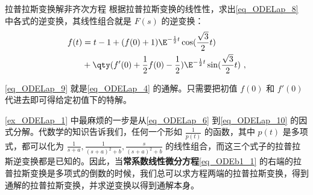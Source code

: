 \begin{example}{拉普拉斯变换解非齐次方程}
根据拉普拉斯变换的线性性，求出\autoref{eq_ODELap_8} 中各式的逆变换，其线性组合就是 $F(s)$ 的逆变换：
\begin{equation}\label{eq_ODELap_9}
\begin{aligned}
f(t)&=t-1+(f(0)+1)\E^{-\frac{1}{2}t}\cos(\frac{\sqrt{3}}{2}t)\\&
+\qty(f'(0)+\frac{1}{2}f(0)-\frac{1}{2})\E^{-\frac{1}{2}t}\sin(\frac{\sqrt{3}}{2}t)~,
\end{aligned}
\end{equation}

\autoref{eq_ODELap_9} 就是\autoref{eq_ODELap_4} 的通解。只需要把初值 $f(0)$ 和 $f'(0)$ 代进去即可得给定初值下的特解。




\end{example}

\autoref{ex_ODELap_1} 中最麻烦的一步是从\autoref{eq_ODELap_6} 到\autoref{eq_ODELap_10} 的因式分解。代数学的知识告诉我们，任何一个形如 $\frac{1}{p(t)}$ 的函数，其中 $p(t)$ 是多项式，都可以化为 $\frac{1}{s+a}, \frac{1}{(s+a)^2+b}, \frac{s}{(s+a)^2+b}$ 的线性组合，而这三个式子的拉普拉斯逆变换都是已知的。因此，当\textbf{常系数线性微分方程}\autoref{eq_ODEb1_1} 的右端的拉普拉斯变换是多项式的倒数的时候，我们总可以求方程两端的拉普拉斯变换，得到通解的拉普拉斯变换，并求逆变换以得到通解本身。















